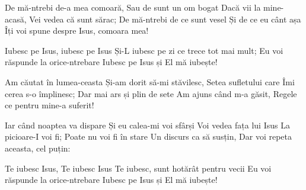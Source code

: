 
\beginverse
De mă-ntrebi de-a mea comoară,
Sau de sunt un om bogat
Dacă vii la mine-acasă,
Vei vedea că sunt sărac;
De mă-ntrebi de ce sunt vesel
Și de ce eu cânt așa
Îți voi spune despre Isus, comoara mea!
\endverse

\beginchorus
Iubesc pe Isus, iubesc pe Isus
Și-L iubesc pe zi ce trece tot mai mult;
Eu voi răspunde la orice-ntrebare
Iubesc pe Isus și El mă iubește!
\endchorus

\beginverse
Am căutat în lumea-ceasta
Și-am dorit să-mi stăvilesc,
Setea sufletului care
Îmi cerea s-o împlinesc;
Dar mai ars și plin de sete
Am ajuns când m-a găsit,
Regele ce pentru mine-a suferit!
\endverse

\beginverse
Iar când noaptea va dispare
Și eu calea-mi voi sfârși
Voi vedea fața lui Isus
La picioare-I voi fi;
Poate nu voi fi în stare
Un discurs ca să susțin,
Dar voi repeta aceasta, cel puțin:
\endverse

\beginchorus
Te iubesc Isus, Te iubesc Isus
Te iubesc, sunt hotărât pentru vecii
Eu voi răspunde la orice-ntrebare
Iubesc pe Isus și El mă iubește!
\endchorus

\endsong